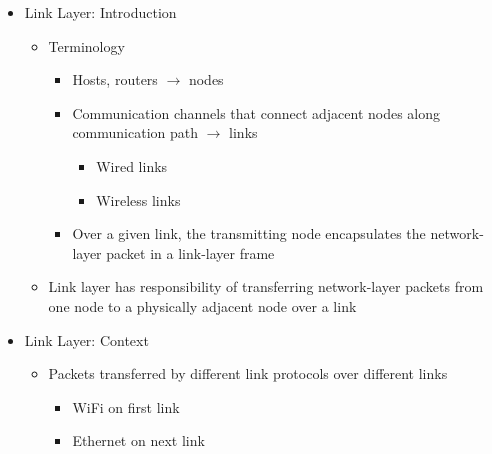 \begin{itemize}

  \item Link Layer: Introduction

    \begin{itemize}

      \item Terminology

        \begin{itemize}

          \item Hosts, routers $\to$ nodes

          \item Communication channels that connect adjacent nodes along communication path $\to$ links

            \begin{itemize}

              \item Wired links

              \item Wireless links

            \end{itemize}

          \item Over a given link, the transmitting node encapsulates the network-layer packet in a link-layer frame

        \end{itemize}

      \item Link layer has responsibility of transferring network-layer packets from one node to a physically adjacent node over a link

    \end{itemize}

  \item Link Layer: Context

    \begin{itemize}

      \item Packets transferred by different link protocols over different links

        \begin{itemize}

          \item WiFi on first link

          \item Ethernet on next link


\end{itemize}
\end{itemize}
\end{itemize}
